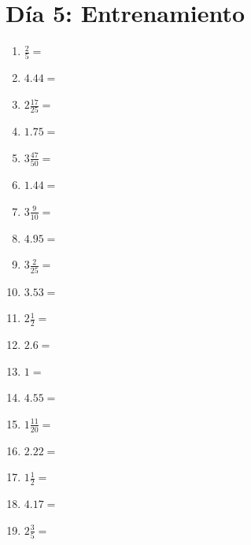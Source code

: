 \documentclass[12pt]{article}
\begin{document}
\section*{Día 5: Entrenamiento}
\begin{enumerate}
\item \large $ \frac{2}{5} = $ \vspace{1.5cm}
\item \large $ 4.44 = $ \vspace{1.5cm}
\item \large $ 2 \frac{17}{25} = $ \vspace{1.5cm}
\item \large $ 1.75 = $ \vspace{1.5cm}
\item \large $ 3 \frac{47}{50} = $ \vspace{1.5cm}
\item \large $ 1.44 = $ \vspace{1.5cm}
\item \large $ 3 \frac{9}{10} = $ \vspace{1.5cm}
\item \large $ 4.95 = $ \vspace{1.5cm}
\item \large $ 3 \frac{2}{25} = $ \vspace{1.5cm}
\item \large $ 3.53 = $ \vspace{1.5cm}
\newpage
\item \large $ 2 \frac{1}{2} = $ \vspace{1.5cm}
\item \large $ 2.6 = $ \vspace{1.5cm}
\item \large $ 1 = $ \vspace{1.5cm}
\item \large $ 4.55 = $ \vspace{1.5cm}
\item \large $ 1 \frac{11}{20} = $ \vspace{1.5cm}
\item \large $ 2.22 = $ \vspace{1.5cm}
\item \large $ 1 \frac{1}{2} = $ \vspace{1.5cm}
\item \large $ 4.17 = $ \vspace{1.5cm}
\item \large $ 2 \frac{3}{5} = $ \vspace{1.5cm}

\end{enumerate}
\end{document}
